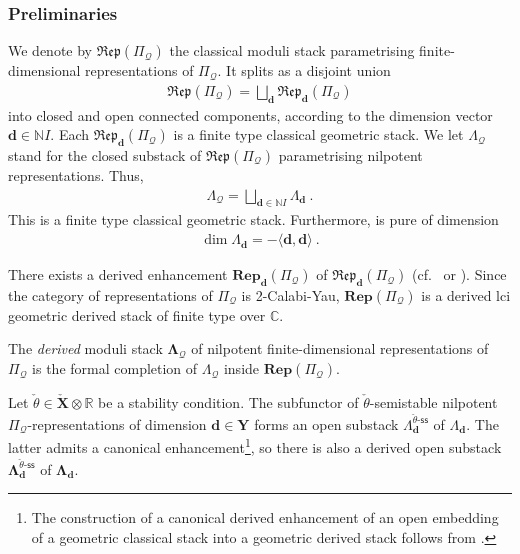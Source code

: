 \documentclass[reqno,a4paper]{amsart}
\newcommand{\C}{\mathbb{C}}
\newcommand{\N}{\mathbb{N}}
\newcommand{\R}{\mathbb{R}}
\newcommand{\bfY}{\mathbf{Y}}
\newcommand{\bfX}{\mathbf{X}}
\newcommand{\bfd}{\mathbf{d}}
\newcommand{\dstackRep}{\mathbf{Rep}}
\newcommand{\stackRep}{\mathfrak{Rep}}
\newcommand{\dLambda}{\mathbf{\Lambda}}
\newcommand{\qv}{\mathcal{Q}}
\newcommand{\Ltheta}{\check{\theta}}
\newcommand{\rootlattice}{\bfY}
\newcommand{\weightlattice}{\bfX}
\newcommand{\coweightlattice}{\check{\weightlattice}}
\theoremstyle{basic-theorem}
\numberwithin{equation}{section}
\begin{document}
\subsubsection{Preliminaries}

We denote by $\stackRep(\Pi_\qv)$ the classical moduli stack parametrising finite-dimensional representations of $\Pi_\qv$. It splits as a disjoint union
\begin{align}
	\stackRep(\Pi_\qv)=\bigsqcup_\bfd\stackRep_\bfd(\Pi_\qv)
\end{align}
into closed and open connected components, according to the dimension vector $\bfd \in \N I$. Each $\stackRep_\bfd(\Pi_\qv)$ is a finite type classical geometric stack. We let $\Lambda_\qv$ stand for the closed substack of $\stackRep(\Pi_\qv)$ parametrising nilpotent representations. Thus,
\begin{align}
	\Lambda_\qv=\bigsqcup_{\bfd \in \N I} \Lambda_{\bfd}\ .
\end{align}
This is a finite type classical geometric stack. Furthermore,  is pure of dimension
\begin{align}
	\dim \Lambda_{\bfd}=-\langle \bfd, \bfd \rangle\ .
\end{align}

There exists a derived enhancement $\dstackRep_\bfd(\Pi_\qv)$ of $\stackRep_\bfd(\Pi_\qv)$ (cf.\ \cite[\S2.1.4]{VV_KHA} or \cite[\S~I.2]{DPS_Torsion-pairs}). Since the category of representations of $\Pi_\qv$ is 2-Calabi-Yau, $\dstackRep(\Pi_\qv)$ is a derived lci geometric derived stack of finite type over $\C$.
\begin{definition}
	The \textit{derived} moduli stack $\dLambda_\qv$ of nilpotent finite-dimensional representations of $\Pi_\qv$ is the formal completion of $\Lambda_\qv$ inside $\dstackRep(\Pi_\qv)$.
\end{definition}

Let $\Ltheta \in \coweightlattice\otimes \R$ be a stability condition. The subfunctor of $\Ltheta$-semistable nilpotent $\Pi_\qv$-representations of dimension $\bfd\in \rootlattice$ forms an open substack $\Lambda_\bfd^{\Ltheta\textrm{-}\mathsf{ss}}$ of $\Lambda_\bfd$. The latter admits a canonical enhancement\footnote{The construction of a canonical derived enhancement of an open embedding of a geometric classical stack into a geometric derived stack follows from \cite[Proposition~2.1]{STV}.}, so there is also a derived open substack  $\dLambda_\bfd^{\Ltheta\textrm{-}\mathsf{ss}}$ of $\dLambda_\bfd$. 
\end{document}
